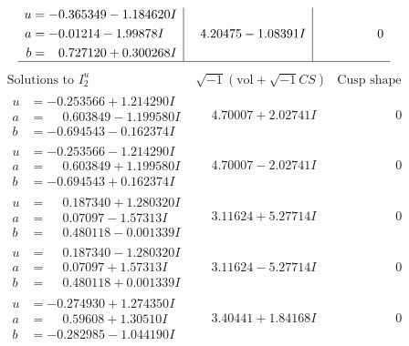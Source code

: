 \documentclass[1p]{elsarticle_modified}
\theoremstyle{definition}
\newcommand{\I}{\sqrt{-1}}
\begin{document}
$$\begin{array}{c|c|c}
\begin{aligned}
u &= -0.365349 - 1.184620 I \\
a &= -0.01214 - 1.99878 I \\
b &= \phantom{-}0.727120 + 0.300268 I\end{aligned}
 & \phantom{-}4.20475 - 1.08391 I & \phantom{-0.000000 } 0\\
 \hline 
 \end{array}$$\newpage$$\begin{array}{c|c|c}  
\text{Solutions to }I^u_{2}& \I (\text{vol} + \sqrt{-1}CS) & \text{Cusp shape}\\
 \hline 
\begin{aligned}
u &= -0.253566 + 1.214290 I \\
a &= \phantom{-}0.603849 - 1.199580 I \\
b &= -0.694543 - 0.162374 I\end{aligned}
 & \phantom{-}4.70007 + 2.02741 I & \phantom{-0.000000 } 0 \\ \hline\begin{aligned}
u &= -0.253566 - 1.214290 I \\
a &= \phantom{-}0.603849 + 1.199580 I \\
b &= -0.694543 + 0.162374 I\end{aligned}
 & \phantom{-}4.70007 - 2.02741 I & \phantom{-0.000000 } 0 \\ \hline\begin{aligned}
u &= \phantom{-}0.187340 + 1.280320 I \\
a &= \phantom{-}0.07097 - 1.57313 I \\
b &= \phantom{-}0.480118 - 0.001339 I\end{aligned}
 & \phantom{-}3.11624 + 5.27714 I & \phantom{-0.000000 } 0 \\ \hline\begin{aligned}
u &= \phantom{-}0.187340 - 1.280320 I \\
a &= \phantom{-}0.07097 + 1.57313 I \\
b &= \phantom{-}0.480118 + 0.001339 I\end{aligned}
 & \phantom{-}3.11624 - 5.27714 I & \phantom{-0.000000 } 0 \\ \hline\begin{aligned}
u &= -0.274930 + 1.274350 I \\
a &= \phantom{-}0.59608 + 1.30510 I \\
b &= -0.282985 - 1.044190 I\end{aligned}
 & \phantom{-}3.40441 + 1.84168 I & \phantom{-0.000000 } 0 \\ \hline\begin{aligned}

\end{aligned}
\end{array}$$
\end{document}
